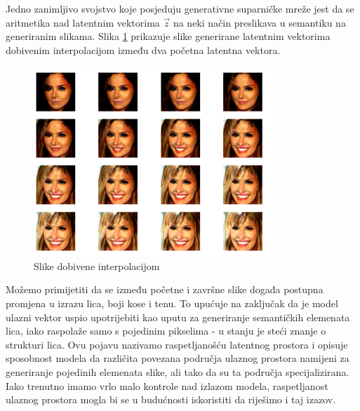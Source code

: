 Jedno zanimljivo svojstvo koje posjeduju generativne suparničke mreže jest da se aritmetika nad latentnim vektorima $\vec{z}$ na neki način preslikava u semantiku na generiranim slikama. Slika \ref{interpolation} prikazuje slike generirane latentnim vektorima dobivenim interpolacijom između dva početna latentna vektora. 

\begin{figure}[h]
\centering
		\includegraphics[width=0.8\textwidth]{images/generated/interpolation_1.png}
\caption{Slike dobivene interpolacijom}
\label{interpolation}
\end{figure}

Možemo primijetiti da se između početne i završne slike događa postupna promjena u izrazu lica, boji kose i tenu. To upućuje na zaključak da je model ulazni vektor uspio upotrijebiti kao uputu za generiranje semantičkih elemenata lica, iako raspolaže samo s pojedinim pikselima - u stanju je steći znanje o strukturi lica. Ovu pojavu nazivamo raspetljanošću  latentnog prostora i opisuje sposobnost modela da različita povezana područja ulaznog prostora namijeni za generiranje pojedinih elemenata slike, ali tako da su ta područja specijalizirana. Iako trenutno imamo vrlo malo kontrole nad izlazom modela, raspetljanost ulaznog prostora mogla bi se u budućnosti iskoristiti da riješimo i taj izazov.